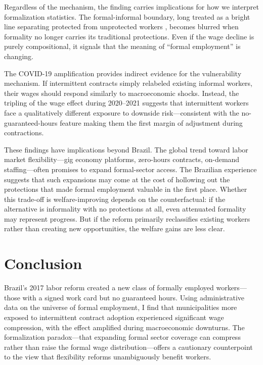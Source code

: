 \documentclass[12pt]{article}
\begin{document}
Regardless of the mechanism, the finding carries implications for how we interpret formalization statistics. The formal-informal boundary, long treated as a bright line separating protected from unprotected workers \citep{LaPortaShleifer2014}, becomes blurred when formality no longer carries its traditional protections. Even if the wage decline is purely compositional, it signals that the meaning of ``formal employment'' is changing.

The COVID-19 amplification provides indirect evidence for the vulnerability mechanism. If intermittent contracts simply relabeled existing informal workers, their wages should respond similarly to macroeconomic shocks. Instead, the tripling of the wage effect during 2020--2021 suggests that intermittent workers face a qualitatively different exposure to downside risk---consistent with the no-guaranteed-hours feature making them the first margin of adjustment during contractions.

These findings have implications beyond Brazil. The global trend toward labor market flexibility---gig economy platforms, zero-hours contracts, on-demand staffing---often promises to expand formal-sector access. The Brazilian experience suggests that such expansions may come at the cost of hollowing out the protections that made formal employment valuable in the first place. Whether this trade-off is welfare-improving depends on the counterfactual: if the alternative is informality with no protections at all, even attenuated formality may represent progress. But if the reform primarily reclassifies existing workers rather than creating new opportunities, the welfare gains are less clear.

\section{Conclusion}

Brazil's 2017 labor reform created a new class of formally employed workers---those with a signed work card but no guaranteed hours. Using administrative data on the universe of formal employment, I find that municipalities more exposed to intermittent contract adoption experienced significant wage compression, with the effect amplified during macroeconomic downturns. The formalization paradox---that expanding formal sector coverage can compress rather than raise the formal wage distribution---offers a cautionary counterpoint to the view that flexibility reforms unambiguously benefit workers.
\end{document}
